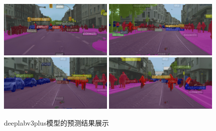 \documentclass[12pt]{ctexart}
\begin{document}
\begin{figure}[htbp]  %
    \centering        %
    \includegraphics[width=0.49\textwidth]{result/plot/predict_deeplabv3plus.jpg}
    \includegraphics[width=0.49\textwidth]{result/plot/predict_1_deeplabv3plus.jpg}
    \includegraphics[width=0.49\textwidth]{result/plot/predict_2_deeplabv3plus.jpg}
    \includegraphics[width=0.49\textwidth]{result/plot/predict_3_deeplabv3plus.jpg}
    \caption{deeplabv3plus模型的预测结果展示}
    \label{fig:predict_deeplabv3plus}
\end{figure}
\end{document}
